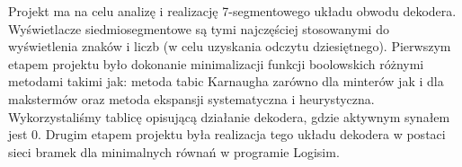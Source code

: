 Projekt ma na celu analizę i realizację 7-segmentowego układu obwodu dekodera. Wyświetlacze siedmiosegmentowe są tymi najczęściej stosowanymi do wyświetlenia znaków i liczb (w celu uzyskania odczytu dziesiętnego).
Pierwszym etapem projektu było dokonanie minimalizacji funkcji boolowskich różnymi metodami takimi jak: metoda tabic Karnaugha zarówno dla minterów jak i dla makstermów oraz metoda ekspansji systematyczna i heurystyczna.
Wykorzystaliśmy tablicę opisującą działanie dekodera, gdzie aktywnym synałem jest 0.
Drugim etapem projektu była realizacja tego układu dekodera w postaci sieci bramek dla minimalnych równań w programie Logisim.
